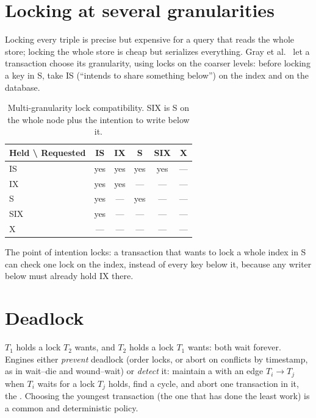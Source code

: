 \section{Locking at several granularities}

Locking every triple is precise but expensive for a query that reads the whole
store; locking the whole store is cheap but serializes everything. Gray et al.\
\cite{gray1976} let a transaction choose its granularity, using
 locks on the coarser levels: before locking a key in S, take
IS (``intends to share something below'') on the index and on the database.

\begin{table}[ht]
\centering
\begin{tabular}{@{}lccccc@{}}
\toprule
Held \textbackslash{} Requested & IS & IX & S & SIX & X \\
\midrule
IS  & yes & yes & yes & yes & --- \\
IX  & yes & yes & --- & --- & --- \\
S   & yes & --- & yes & --- & --- \\
SIX & yes & --- & --- & --- & --- \\
X   & --- & --- & --- & --- & --- \\
\bottomrule
\end{tabular}
\caption{Multi-granularity lock compatibility. SIX is S on the whole node plus the intention to write below it.}
\label{tab:compat}
\end{table}

The point of intention locks: a transaction that wants to lock a whole index in
S can check one lock on the index, instead of every key below it, because any
writer below must already hold IX there.

\section{Deadlock}

$T_1$ holds a lock $T_2$ wants, and $T_2$ holds a lock $T_1$ wants: both wait
forever. Engines either \emph{prevent} deadlock (order locks, or abort on
conflicts by timestamp, as in wait--die and wound--wait) or \emph{detect} it:
maintain a \term{waits-for graph} with an edge $T_i \to T_j$ when $T_i$ waits for
a lock $T_j$ holds, find a cycle, and abort one transaction in it, the
\term{victim}. Choosing the youngest transaction (the one that has done the least
work) is a common and deterministic policy.

